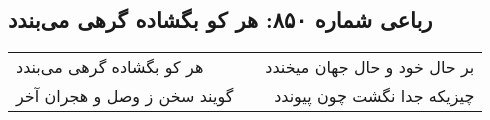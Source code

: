 \begin{center}
\section*{رباعی شماره ۸۵۰: هر کو بگشاده گرهی می‌بندد}
\label{sec:0850}
\begin{longtable}{l p{0.5cm} r}
هر کو بگشاده گرهی می‌بندد
&&
بر حال خود و حال جهان میخندد
\\
گویند سخن ز وصل و هجران آخر
&&
چیزیکه جدا نگشت چون پیوندد
\\
\end{longtable}
\end{center}
